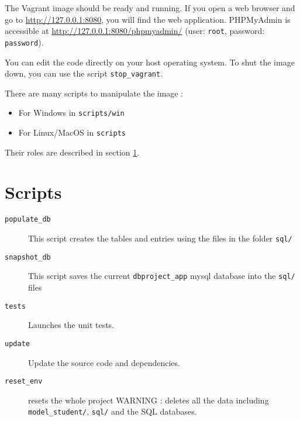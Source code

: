 \documentclass[twoside,a4paper,12pt]{article}
\begin{document}
The Vagrant image should be ready and running. If you open a web browser and go to \url{http://127.0.0.1:8080}, you will find the web application. PHPMyAdmin is accessible at \url{http://127.0.0.1:8080/phpmyadmin/} (user: \texttt{root}, password: \texttt{password}).

You can edit the code directly on your host operating system. To shut the image down, you can use the script \texttt{stop\_vagrant}.

There are many scripts to manipulate the image :
\begin{itemize}
	\item For Windows in \texttt{scripts/win}
	\item For Linux/MacOS in \texttt{scripts}
\end{itemize}

Their roles are described in section \ref{sec:scripts}. 
\newpage
\section{Scripts}
\label{sec:scripts}

\begin{description}
	\item[\texttt{populate\_db}] This script creates the tables and entries using the files in the folder \texttt{sql/}
	\item[\texttt{snapshot\_db}] This script saves the current \texttt{dbproject\_app} mysql database into the \texttt{sql/} files
	\item[\texttt{tests}] Launches the unit tests.
	\item[\texttt{update}] Update the source code and dependencies.
	\item[\texttt{reset\_env}] resets the whole project WARNING : deletes all the data including \texttt{model\_student/}, \texttt{sql/} and the SQL databases.
\end{description}
\end{document}
